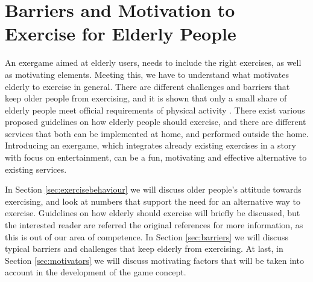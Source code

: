 \chapter{Barriers and Motivation to Exercise for Elderly People}
\label{chap:olderexercise}

An exergame aimed at elderly users, needs to include the right exercises, as well as motivating elements. Meeting this, we have to understand what motivates elderly to exercise in general. There are different challenges and barriers that keep older people from exercising, and it is shown that only a small share of elderly people meet official requirements of physical activity \cite{statistikknorge12}. There exist various proposed guidelines on how elderly people should exercise, and there are different services that both can be implemented at home, and performed outside the home. Introducing an exergame, which integrates already existing exercises in a story with focus on entertainment, can be a fun, motivating and effective alternative to existing services.  

In Section \ref{sec:exercisebehaviour} we will discuss older people's attitude towards exercising, and look at numbers that support the need for an alternative way to exercise. Guidelines on how elderly should exercise will briefly be discussed, but the interested reader are referred the original references for more information, as this is out of our area of competence. In Section \ref{sec:barriers} we will discuss typical barriers and challenges that keep elderly from exercising. At last, in Section \ref{sec:motivators} we will discuss motivating factors that will be taken into account in the development of the game concept.  

